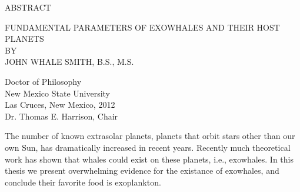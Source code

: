 \begin{center}
ABSTRACT
\end{center}

\bigskip

\begin{center}
FUNDAMENTAL PARAMETERS OF EXOWHALES AND THEIR HOST PLANETS\\
\bigskip
BY\\
\bigskip
JOHN WHALE SMITH, B.S., M.S.
\end{center}

\bigskip

\begin{center}
Doctor of Philosophy\\
New Mexico State University\\
Las Cruces, New Mexico, 2012\\
Dr. Thomas E. Harrison, Chair
\end{center}

\bigskip
\bigskip


The number of known extrasolar planets, planets that orbit stars other than our own Sun, has dramatically increased in recent years. Recently much theoretical work has shown that whales could exist on these planets, i.e., exowhales. In this thesis we present overwhelming evidence for the existance of exowhales, and conclude their favorite food is exoplankton.
